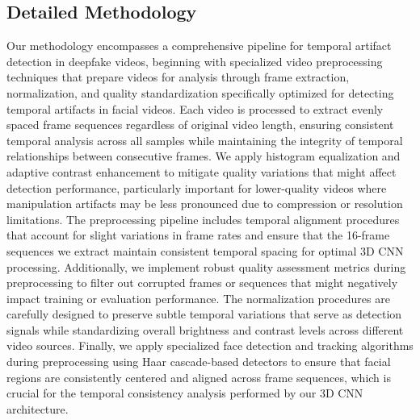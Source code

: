 \documentclass[conference]{IEEEtran}
\begin{document}
\subsection{Detailed Methodology}
Our methodology encompasses a comprehensive pipeline for temporal artifact detection in deepfake videos, beginning with specialized video preprocessing techniques that prepare videos for analysis through frame extraction, normalization, and quality standardization specifically optimized for detecting temporal artifacts in facial videos.
Each video is processed to extract evenly spaced frame sequences regardless of original video length, ensuring consistent temporal analysis across all samples while maintaining the integrity of temporal relationships between consecutive frames.
We apply histogram equalization and adaptive contrast enhancement to mitigate quality variations that might affect detection performance, particularly important for lower-quality videos where manipulation artifacts may be less pronounced due to compression or resolution limitations.
The preprocessing pipeline includes temporal alignment procedures that account for slight variations in frame rates and ensure that the 16-frame sequences we extract maintain consistent temporal spacing for optimal 3D CNN processing.
Additionally, we implement robust quality assessment metrics during preprocessing to filter out corrupted frames or sequences that might negatively impact training or evaluation performance.
The normalization procedures are carefully designed to preserve subtle temporal variations that serve as detection signals while standardizing overall brightness and contrast levels across different video sources.
Finally, we apply specialized face detection and tracking algorithms during preprocessing using Haar cascade-based detectors to ensure that facial regions are consistently centered and aligned across frame sequences, which is crucial for the temporal consistency analysis performed by our 3D CNN architecture.
\end{document}
